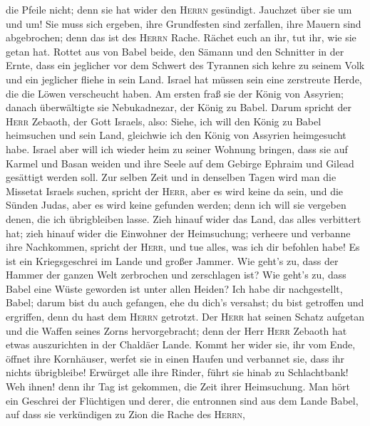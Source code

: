 die Pfeile nicht; denn sie hat wider den \textsc{Herrn} gesündigt.
 Jauchzet über sie um und um! Sie muss sich ergeben, ihre
Grundfesten sind zerfallen, ihre Mauern sind abgebrochen; denn das ist
des \textsc{Herrn} Rache. Rächet euch an ihr, tut ihr, wie sie getan
hat.  Rottet aus von Babel beide, den Sämann und den
Schnitter in der Ernte, dass ein jeglicher vor dem Schwert des Tyrannen
sich kehre zu seinem Volk und ein jeglicher fliehe in sein Land.
 Israel hat müssen sein eine zerstreute Herde, die die
Löwen verscheucht haben. Am ersten fraß sie der König von Assyrien;
danach überwältigte sie Nebukadnezar, der König zu Babel.
 Darum spricht der \textsc{Herr} Zebaoth, der Gott
Israels, also: Siehe, ich will den König zu Babel heimsuchen und sein
Land, gleichwie ich den König von Assyrien heimgesucht habe.
 Israel aber will ich wieder heim zu seiner Wohnung
bringen, dass sie auf Karmel und Basan weiden und ihre Seele auf dem
Gebirge Ephraim und Gilead gesättigt werden soll.  Zur
selben Zeit und in denselben Tagen wird man die Missetat Israels suchen,
spricht der \textsc{Herr}, aber es wird keine da sein, und die Sünden
Judas, aber es wird keine gefunden werden; denn ich will sie vergeben
denen, die ich übrigbleiben lasse.  Zieh hinauf wider das
Land, das alles verbittert hat; zieh hinauf wider die Einwohner der
Heimsuchung; verheere und verbanne ihre Nachkommen, spricht der
\textsc{Herr}, und tue alles, was ich dir befohlen habe! 
Es ist ein Kriegsgeschrei im Lande und großer Jammer. 
Wie geht's zu, dass der Hammer der ganzen Welt zerbrochen und
zerschlagen ist? Wie geht's zu, dass Babel eine Wüste geworden ist unter
allen Heiden?  Ich habe dir nachgestellt, Babel; darum
bist du auch gefangen, ehe du dich's versahst; du bist getroffen und
ergriffen, denn du hast dem \textsc{Herrn} getrotzt.  Der
\textsc{Herr} hat seinen Schatz aufgetan und die Waffen seines Zorns
hervorgebracht; denn der Herr \textsc{Herr} Zebaoth hat etwas
auszurichten in der Chaldäer Lande.  Kommt her wider sie,
ihr vom Ende, öffnet ihre Kornhäuser, werfet sie in einen Haufen und
verbannet sie, dass ihr nichts übrigbleibe!  Erwürget
alle ihre Rinder, führt sie hinab zu Schlachtbank! Weh ihnen! denn ihr
Tag ist gekommen, die Zeit ihrer Heimsuchung.  Man hört
ein Geschrei der Flüchtigen und derer, die entronnen sind aus dem Lande
Babel, auf dass sie verkündigen zu Zion die Rache des \textsc{Herrn},
